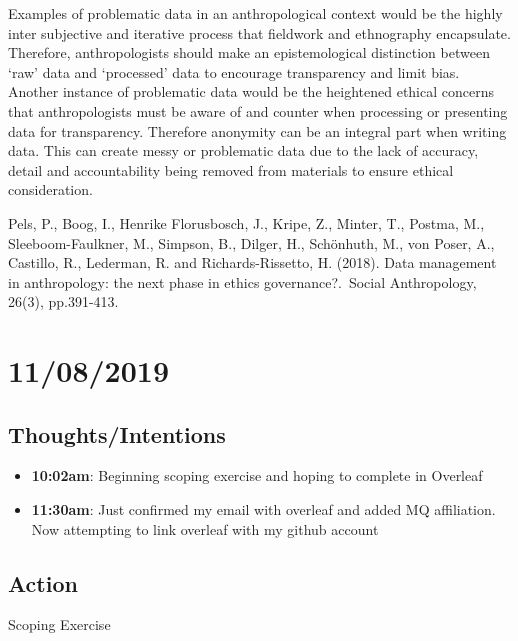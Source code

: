 \documentclass{article}
\begin{document}
Examples of problematic data in an anthropological context would be the highly inter subjective and iterative process that fieldwork and ethnography encapsulate. Therefore, anthropologists should make an epistemological distinction between ‘raw’ data and ‘processed’ data to encourage transparency and limit bias. Another instance of problematic data would be the heightened ethical concerns that anthropologists must be aware of and counter when processing or presenting data for transparency. Therefore anonymity can be an integral part when writing data. This can create messy or problematic data due to the lack of accuracy, detail and accountability being removed from materials to ensure ethical consideration. 



Pels, P., Boog, I., Henrike Florusbosch, J., Kripe, Z., Minter, T., Postma, M., Sleeboom-Faulkner, M., Simpson, B., Dilger, H., Schönhuth, M., von Poser, A., Castillo, R., Lederman, R. and Richards-Rissetto, H. (2018). Data management in anthropology: the next phase in ethics governance?. Social Anthropology, 26(3), pp.391-413.

\section{11/08/2019}

\subsection{Thoughts/Intentions}

\begin{itemize}
\item \textbf{10:02am}: Beginning scoping exercise and hoping to complete in Overleaf
\item \textbf{11:30am}: Just confirmed my email with overleaf and added MQ affiliation. Now attempting to link overleaf with my github account
\end{itemize}

\subsection{Action}

Scoping Exercise
\end{document}
